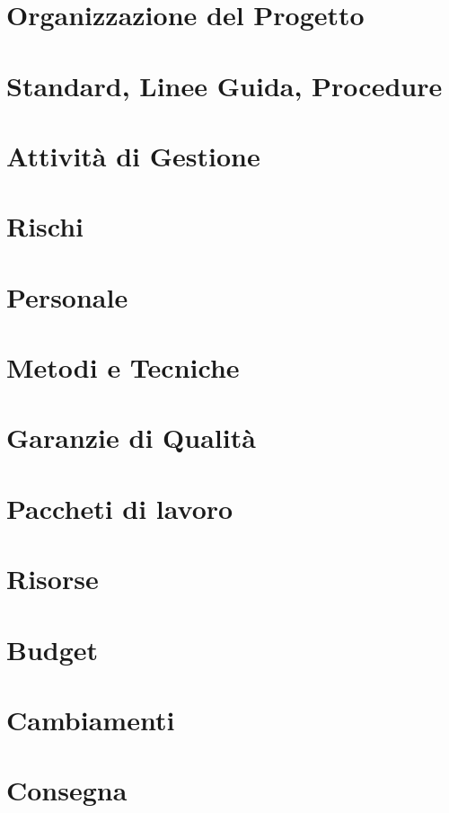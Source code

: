 \documentclass[a4paper,12pt]{article}
\begin{document}
\section{Organizzazione del Progetto} %

\section{Standard, Linee Guida, Procedure} %

\section{Attività di Gestione} %

\section{Rischi} %

\section{Personale} %

\section{Metodi e Tecniche} %

\section{Garanzie di Qualità} %

\section{Paccheti di lavoro} %

\section{Risorse} %

\section{Budget} %

\section{Cambiamenti} %

\section{Consegna} %
\end{document}
